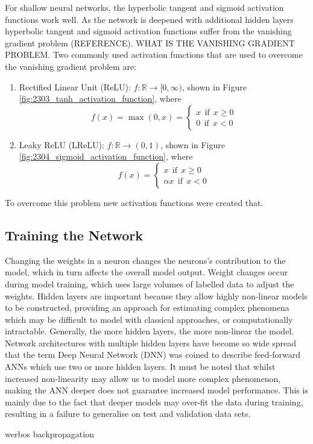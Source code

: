 For shallow neural networks, the hyperbolic tangent and sigmoid activation functions work well. As the network is deepened with additional hidden layers hyperbolic tangent and sigmoid activation functions suffer from the vanishing gradient problem (REFERENCE). WHAT IS THE VANISHING GRADIENT PROBLEM. Two commonly used activation functions that are used to overcome the vanishing gradient problem are:
\begin{enumerate}
	\item Rectified Linear Unit (ReLU): $f:\mathbb{R} \to [0,\infty)$, shown in Figure \ref{fig:2303_tanh_activation_function}, where
	\begin{equation}
		f(x) = \max(0,x) = \begin{cases}
							x \ \ \text{if} \ \ x \geq 0 \\
							0 \ \ \text{if} \ \ x < 0	
						   \end{cases}
	\end{equation}
	\item Leaky ReLU (LReLU): $f:\mathbb{R} \to (0,1)$, shown in Figure \ref{fig:2304_sigmoid_activation_function}, where
	\begin{equation}
		f(x) =  \begin{cases}
				x \ \ \text{if} \ \ x \geq 0 \\
				\alpha x \ \ \text{if} \ \ x < 0	
			   	\end{cases}
	\end{equation}
\end{enumerate}

To overcome this problem new activation functions were created that. 



\subsection{Training the Network} \label{sec:networktraining}
Changing the weights in a neuron changes the neurons’s contribution to the model, which in turn affects the overall model output. Weight changes occur during model training, which uses large volumes of labelled data to adjust the weights. Hidden layers are important because they allow highly non-linear models to be constructed, providing an approach for estimating complex phenomena which may be difficult to model with classical approaches, or computationally intractable. Generally, the more hidden layers, the more non-linear the model. Network architectures with multiple hidden layers have become so wide spread that the term Deep Neural Network (DNN) was coined to describe feed-forward ANNs which use two or more hidden layers. It must be noted that whilst increased non-linearity may allow us to model more complex phenomenon, making the ANN deeper does not guarantee increased model performance. This is mainly due to the fact that deeper models may over-fit the data during training, resulting in a failure to generalise on test and validation data sets.

werbos backpropagation